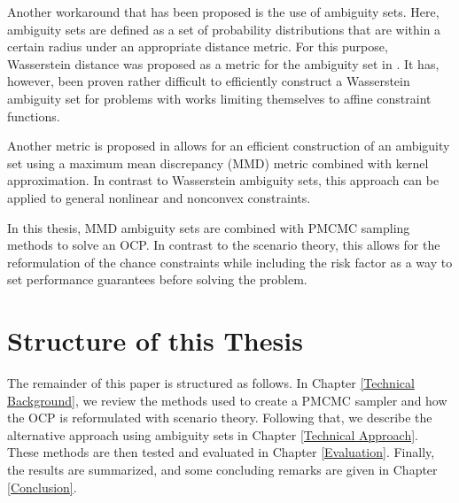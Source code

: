 Another workaround that has been proposed is the use of ambiguity sets. Here, ambiguity sets are defined as a set of probability distributions that are within a certain radius under an appropriate distance metric. For this purpose, Wasserstein distance was proposed as a metric for the ambiguity set in \cite{Hota_19}. It has, however, been proven rather difficult to efficiently construct a Wasserstein ambiguity set for problems with works limiting themselves to affine constraint functions. 

Another metric is proposed in \cite{Yassine_22} allows for an efficient construction of an ambiguity set using a maximum mean discrepancy (MMD) metric combined with kernel approximation. In contrast to Wasserstein ambiguity sets, this approach can be applied to general nonlinear and nonconvex constraints. 

In this thesis, MMD ambiguity sets are combined with PMCMC sampling methods to solve an OCP. In contrast to the scenario theory, this allows for the reformulation of the chance constraints while including the risk factor as a way to set performance guarantees before solving the problem.

\section{Structure of this Thesis} \label{Structure of this Thesis}

The remainder of this paper is structured as follows. In Chapter \ref{Technical Background}, we review the methods used to create a PMCMC sampler and how the OCP is reformulated with scenario theory. Following that, we describe the alternative approach using ambiguity sets in Chapter \ref{Technical Approach}. These methods are then tested and evaluated in Chapter \ref{Evaluation}. Finally, the results are summarized, and some concluding remarks are given in Chapter \ref{Conclusion}.



